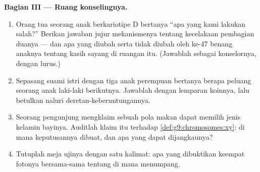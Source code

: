 \begin{problem}
\medskip\noindent\textbf{Bagian III --- Ruang
konselingnya.}
\begin{enumerate}[resume]
  \item Orang tua seorang anak berkariotipe D bertanya ``apa
        yang kami lakukan salah?'' Berikan jawaban jujur
        mekanismenya tentang kecelakaan pembagian duanya ---
        dan apa yang diubah serta tidak diubah oleh ke-47
        benang anaknya tentang kasih sayang di ruangan itu.
        (Jawablah sebagai konselornya, dengan  lurus.)
  \item Sepasang suami istri dengan tiga anak perempuan
        bertanya berapa peluang seorang anak laki-laki
        berikutnya. Jawablah dengan lemparan koinnya, lalu
        betulkan naluri deretan-keberuntungannya.
  \item Seorang pengunjung mengklaim sebuah pola makan dapat
        memilih jenis kelamin bayinya. Auditlah klaim itu
        terhadap \cref{def:g9:chromosomes:xy}: di mana
        keputusannya dibuat, dan apa yang dapat dijangkaunya?
  \item Tutuplah meja ujinya dengan satu kalimat: apa yang
        dibuktikan keempat fotonya bersama-sama tentang di
        mana  menumpang.
\end{enumerate}
\end{problem}
